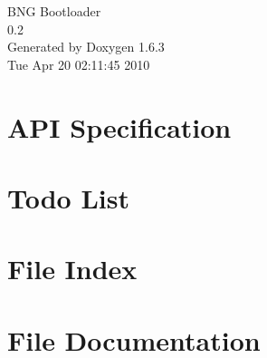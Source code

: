 \documentclass[a4paper]{book}
\begin{document}
\begin{titlepage}
\vspace*{7cm}
\begin{center}
{\Large BNG Bootloader \\[1ex]\large 0.2 }\\
\vspace*{1cm}
{\large Generated by Doxygen 1.6.3}\\
\vspace*{0.5cm}
{\small Tue Apr 20 02:11:45 2010}\\
\end{center}
\end{titlepage}
\clearemptydoublepage
{}
\tableofcontents
\clearemptydoublepage
{}
\chapter{API Specification}
\label{index}
\chapter{Todo List}
\label{todo}

\chapter{File Index}

\chapter{File Documentation}








\printindex
\end{document}
